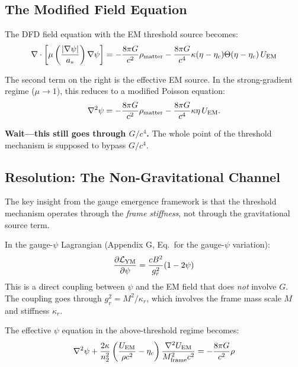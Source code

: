 \documentclass[12pt,a4paper]{article}
\begin{document}
\subsection{The Modified Field Equation}

The DFD field equation with the EM threshold source becomes:
\begin{equation}
\nabla \cdot \left[\mu\left(\frac{|\nabla\psi|}{a_*}\right) \nabla\psi \right]
= -\frac{8\pi G}{c^2}\rho_{\rm matter}
- \frac{8\pi G}{c^4}\kappa(\eta - \eta_c)\Theta(\eta - \eta_c)\, U_{\rm EM}
\label{eq:modified-poisson}
\end{equation}

The second term on the right is the effective EM source.  In the
strong-gradient regime ($\mu \to 1$), this reduces to a modified Poisson equation:
\begin{equation}
\nabla^2 \psi = -\frac{8\pi G}{c^2}\rho_{\rm matter}
- \frac{8\pi G}{c^4}\kappa\eta\, U_{\rm EM}.
\end{equation}

\textbf{Wait---this still goes through $G/c^4$.}  The whole point of the
threshold mechanism is supposed to bypass $G/c^4$.

\subsection{Resolution: The Non-Gravitational Channel}

The key insight from the gauge emergence framework is that the threshold
mechanism operates through the \emph{frame stiffness}, not through the
gravitational source term.

In the gauge-$\psi$ Lagrangian (Appendix G, Eq.\ for the gauge-$\psi$ variation):
\begin{equation}
\frac{\partial \mathcal{L}_{\rm YM}}{\partial \psi} = \frac{c B^2}{g_r^2}(1 - 2\psi)
\end{equation}
This is a direct coupling between $\psi$ and the EM field that does \emph{not}
involve $G$.  The coupling goes through $g_r^2 = M^2/\kappa_r$, which involves
the frame mass scale $M$ and stiffness $\kappa_r$.

The effective $\psi$ equation in the above-threshold regime becomes:
\begin{equation}
\nabla^2 \psi + \frac{2\kappa}{n_2^2}\left(\frac{U_{\rm EM}}{\rho c^2} - \eta_c\right)
\frac{\nabla^2 U_{\rm EM}}{M_{\rm frame}^2 c^2} = -\frac{8\pi G}{c^2}\rho
\label{eq:frame-stiffness-eq}
\end{equation}
\end{document}
